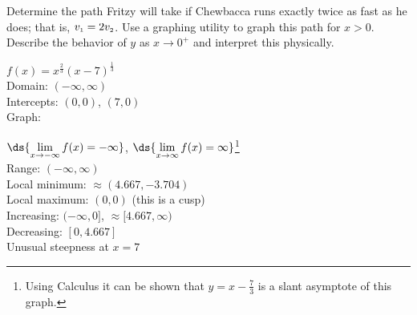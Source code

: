 \documentclass{ximera}
\begin{document}
\begin{question}
Determine the path Fritzy will take if Chewbacca runs exactly twice as fast as he does;  that is, $v_{\mbox{\tiny$1$}} = 2v_{\mbox{\tiny$2$}}$.  Use a graphing utility to graph this path for $x > 0$.  Describe the behavior of $y$ as $x \rightarrow 0^{+}$ and interpret this physically.
\begin{solution}
$f(x) = x^{\frac{2}{3}}(x - 7)^{\frac{1}{3}}$\\
Domain: $(-\infty, \infty)$\\
Intercepts: $(0,0)$, $(7,0)$\\
Graph: \\

% 


\vfill


$\ds{\lim_{x \rightarrow - \infty} f(x) = - \infty}$, $\ds{\lim_{x \rightarrow \infty} f(x) = \infty}$\footnote{Using Calculus it can be shown that $y = x - \frac{7}{3}$ is a slant asymptote of this graph.}\\
Range: $(-\infty, \infty)$\\
Local minimum: $\approx (4.667, -3.704)$\\
Local maximum: $(0,0)$ (this is a cusp) \\
Increasing: $(-\infty, 0]$, $\approx [4.667, \infty)$\\
Decreasing: $[0, 4.667]$\\
Unusual steepness at $x = 7$\\


\end{solution}
\end{question}
\end{document}
